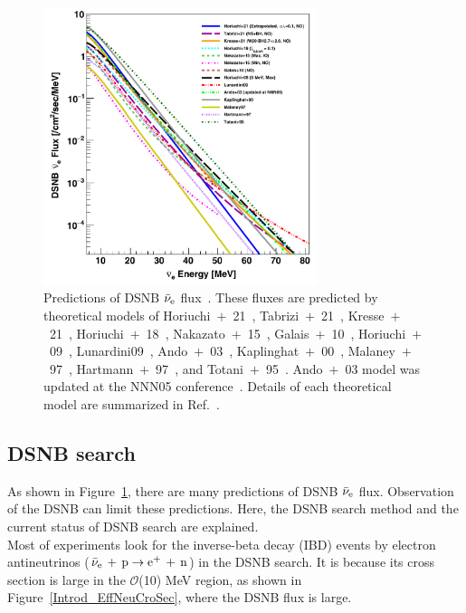 \begin{figure}[p]
	\centering
	\includegraphics[width=8cm]{Figures/Introduction/DSNBpred}
	\caption[Predictions of DSNB $\bar{\nu}_{\rm e}$ flux]{
	Predictions of DSNB $\bar{\nu}_{\rm e}$ flux~\cite{2021Abe}.
	These fluxes are predicted by theoretical models of 
	Horiuchi~$+$~21~\cite{2021Horiuchi}, Tabrizi~$+$~21~\cite{2021Tabrizi}, Kresse~$+$~21~\cite{2021Kresse},
	Horiuchi~$+$~18~\cite{2018Horiuchi}, Nakazato~$+$~15~\cite{2015Nakazato}, Galais~$+$~10~\cite{2010Galais},
	Horiuchi~$+$~09~\cite{2009Horiuchi}, Lunardini09~\cite{2009Lunardini}, Ando~$+$~03~\cite{2003Ando}, Kaplinghat~$+$~00~\cite{2000Kaplinghat},
	Malaney~$+$~97~\cite{1997Malaney}, Hartmann~$+$~97~\cite{1997Hartmann}, and Totani~$+$~95~\cite{1995Totani}.
	Ando~$+$~03 model was updated at the NNN05 conference~\cite{2005Ando}.
	Details of each theoretical model are summarized in Ref.~\cite{2021Abe,2023HaradaPhD}.
	}\label{Introd_DSNBpred}
\end{figure}





\subsection{DSNB search}\label{Subsec_DSNBsearch}
\vs\hs
As shown in Figure~\ref{Introd_DSNBpred}, there are many predictions of DSNB $\bar{\nu}_{\rm e}$ flux.
Observation of the DSNB can limit these predictions.
Here, the DSNB search method and the current status of DSNB search are explained.\\
\hs
Most of experiments look for the inverse-beta decay (IBD) events by electron antineutrinos ($\bar{\nu}_{\rm e}\,+\,{\rm p} \to {\rm e}^{+}\,+\,{\rm n}$) in the DSNB search.
It is because its cross section is large in the $\mathcal{O}$(10) MeV region, as shown in Figure~\ref{Introd_EffNeuCroSec}, where the DSNB flux is large.

